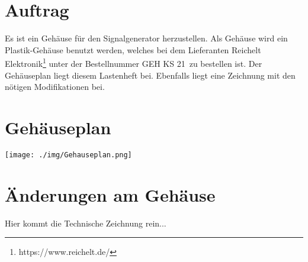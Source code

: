 
\section{Auftrag}
Es ist ein Gehäuse für den Signalgenerator herzustellen. Als Gehäuse wird ein Plastik-Gehäuse benutzt werden, welches bei dem Lieferanten Reichelt Elektronik\footnote{https://www.reichelt.de/} unter der Bestellnummer \glqq GEH KS 21\grqq\ zu bestellen ist. Der Gehäuseplan liegt diesem Lastenheft bei. Ebenfalls liegt eine Zeichnung mit den nötigen Modifikationen bei.

\section{Gehäuseplan}
\begin{center}
\texttt{[image: ./img/Gehauseplan.png]}
\end{center}

\section{Änderungen am Gehäuse}
Hier kommt die Technische Zeichnung rein...